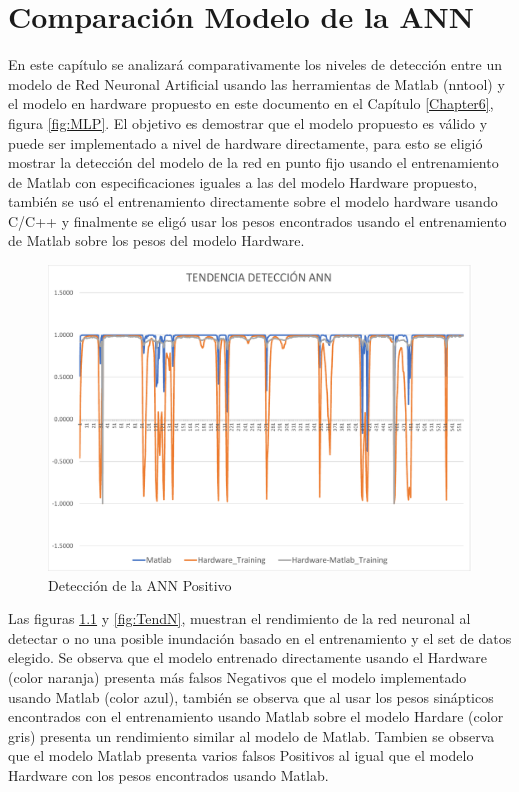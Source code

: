 
\chapter{Comparación Modelo de la ANN} %
\label{Chapter12}

En este capítulo se analizará comparativamente los niveles de detección entre un modelo de Red Neuronal Artificial usando las herramientas de Matlab (nntool) y el modelo en hardware propuesto en este documento en el Capítulo \ref{Chapter6}, figura \ref{fig:MLP}. El objetivo es demostrar que el modelo propuesto es válido y puede ser implementado a nivel de hardware directamente, para esto se eligió mostrar la detección del modelo de la red en punto fijo usando el entrenamiento de Matlab con especificaciones iguales a las del modelo Hardware propuesto, también se usó el entrenamiento directamente sobre el modelo hardware usando C/C++ y finalmente se eligó usar los pesos encontrados usando el entrenamiento de Matlab sobre los pesos del modelo Hardware.

\begin{figure}[H]
	\centering
		\includegraphics[scale=0.6]{./Figures/TendenciaANN1}
	\caption{Detección de la ANN Positivo}
	\label{fig:TendP}
\end{figure}

 Las figuras \ref{fig:TendP} y \ref{fig:TendN}, muestran el rendimiento de la red neuronal al detectar o no una posible inundación basado en el entrenamiento y el set de datos elegido. Se observa que el modelo entrenado directamente usando el Hardware (color naranja) presenta más falsos Negativos que el modelo implementado usando Matlab (color azul), también se observa que al usar los pesos sinápticos encontrados con el entrenamiento usando Matlab sobre el modelo Hardare (color gris) presenta un rendimiento similar al modelo de Matlab. Tambien se observa que el modelo Matlab presenta varios falsos Positivos al igual que el modelo Hardware con los pesos encontrados usando Matlab.
 


